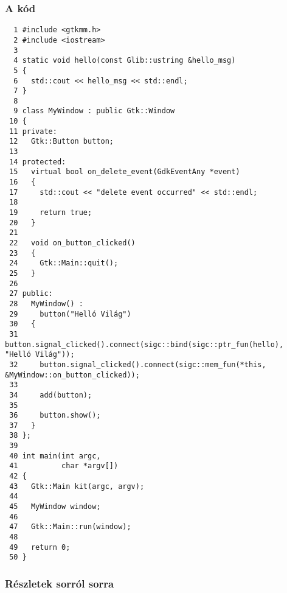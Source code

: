 \documentclass[a4paper,10pt]{article}
\begin{document}
\subsubsection{A kód}

\vspace{16pt}
\fontsize{6pt}{6pt}
\begin{verbatim}
  1 #include <gtkmm.h>
  2 #include <iostream>
  3 
  4 static void hello(const Glib::ustring &hello_msg)
  5 {
  6   std::cout << hello_msg << std::endl;
  7 }
  8 
  9 class MyWindow : public Gtk::Window
 10 {
 11 private:
 12   Gtk::Button button;
 13 
 14 protected:
 15   virtual bool on_delete_event(GdkEventAny *event)
 16   {
 17     std::cout << "delete event occurred" << std::endl;
 18 
 19     return true;
 20   }
 21 
 22   void on_button_clicked()
 23   {
 24     Gtk::Main::quit();
 25   }
 26 
 27 public:
 28   MyWindow() :
 29     button("Helló Világ")
 30   {
 31     button.signal_clicked().connect(sigc::bind(sigc::ptr_fun(hello), "Helló Világ"));
 32     button.signal_clicked().connect(sigc::mem_fun(*this, &MyWindow::on_button_clicked));
 33 
 34     add(button);
 35 
 36     button.show();
 37   }
 38 };
 39 
 40 int main(int argc,
 41          char *argv[])
 42 {
 43   Gtk::Main kit(argc, argv);
 44 
 45   MyWindow window;
 46 
 47   Gtk::Main::run(window);
 48 
 49   return 0;
 50 }
\end{verbatim}

\subsubsection{Részletek sorról sorra}
\end{document}

